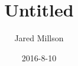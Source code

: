 \documentclass{article}
\title{Untitled}
\author{Jared Millson}
\date{2016-8-10}
\begin{document}
\maketitle


\cite{Brandom1994}
\cite{Brandom2008}


\printbibliography
\end{document}
